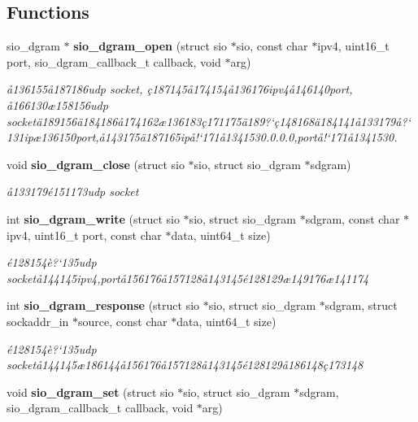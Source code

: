\subsection*{Functions}
\begin{CompactItemize}
\item 
sio\_\-dgram $\ast$ {\bf sio\_\-dgram\_\-open} (struct sio $\ast$sio, const char $\ast$ipv4, uint16\_\-t port, sio\_\-dgram\_\-callback\_\-t callback, void $\ast$arg)
\begin{CompactList}\small\item\em \aa{}136155\aa{}187186udp socket, \c{c}187145\aa{}174154\aa{}136176ipv4\aa{}146140port, \aa{}166130\ae{}158156udp socket\"{a}189156\"{a}184186\aa{}174162\ae{}136183\c{c}171175\"{a}189?`\c{c}148168\"{a}184141\aa{}133179\aa{}?`131ip\ae{}136150port,\aa{}143175\"{a}187165ip\aa{}!`171\aa{}1341530.0.0.0,port\aa{}!`171\aa{}1341530. \item\end{CompactList}\item 
void {\bf sio\_\-dgram\_\-close} (struct sio $\ast$sio, struct sio\_\-dgram $\ast$sdgram)
\begin{CompactList}\small\item\em \aa{}133179\'{e}151173udp socket \item\end{CompactList}\item 
int {\bf sio\_\-dgram\_\-write} (struct sio $\ast$sio, struct sio\_\-dgram $\ast$sdgram, const char $\ast$ipv4, uint16\_\-t port, const char $\ast$data, uint64\_\-t size)
\begin{CompactList}\small\item\em \'{e}128154\`{e}?`135udp socket\aa{}144145ipv4,port\aa{}156176\aa{}157128\aa{}143145\'{e}128129\ae{}149176\ae{}141174 \item\end{CompactList}\item 
int {\bf sio\_\-dgram\_\-response} (struct sio $\ast$sio, struct sio\_\-dgram $\ast$sdgram, struct sockaddr\_\-in $\ast$source, const char $\ast$data, uint64\_\-t size)
\begin{CompactList}\small\item\em \'{e}128154\`{e}?`135udp socket\aa{}144145\ae{}186144\aa{}156176\aa{}157128\aa{}143145\'{e}128129\aa{}186148\c{c}173148 \item\end{CompactList}\item 
void {\bf sio\_\-dgram\_\-set} (struct sio $\ast$sio, struct sio\_\-dgram $\ast$sdgram, sio\_\-dgram\_\-callback\_\-t callback, void $\ast$arg)

\end{CompactItemize}
